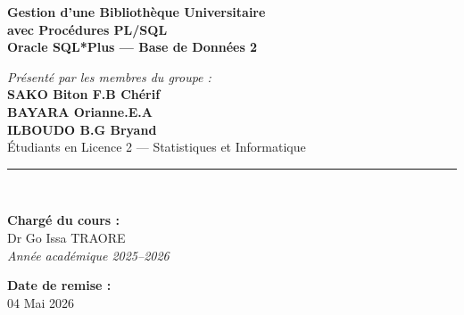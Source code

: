 \documentclass[12pt, a4paper]{report}
\begin{document}
\begin{titlepage}
    \begin{tcolorbox}[colback=sectioncolor!15, colframe=sectioncolor,
                      width=\textwidth, halign=center]
        \centering
        \textcolor{sectioncolor}{\large \textbf{Gestion d'une Bibliothèque Universitaire}}\\[0.3cm]
        \textcolor{sectioncolor}{\large \textbf{avec Procédures PL/SQL}}\\[0.3cm]
        \textcolor{sectioncolor}{\normalsize \textbf{Oracle SQL*Plus --- Base de Données 2}}
    \end{tcolorbox}

    \vspace{0.8cm}

    \begin{center}
        \textit{Présenté par les membres du groupe :}\\[0.5cm]
        {\large \textbf{SAKO Biton F.B Chérif}}\\[0.2cm]
        {\large \textbf{BAYARA Orianne.E.A}}\\[0.2cm]
        {\large \textbf{ILBOUDO B.G Bryand}}\\[0.3cm]
        {\small Étudiants en Licence 2 --- Statistiques et Informatique}
    \end{center}

    \vfill

    \rule{\linewidth}{0.8pt}\\[0.3cm]
    \noindent
    \begin{minipage}[t]{0.5\textwidth}
        \textbf{Chargé du cours :}\\[0.2cm]
        Dr Go Issa TRAORE\\
        \textit{Année académique 2025--2026}
    \end{minipage}
    \hfill
    \begin{minipage}[t]{0.4\textwidth}
        \raggedleft
        \textbf{Date de remise :}\\[0.2cm]
        04 Mai 2026
    \end{minipage}

\end{titlepage}

\tableofcontents
\newpage

\end{document}
